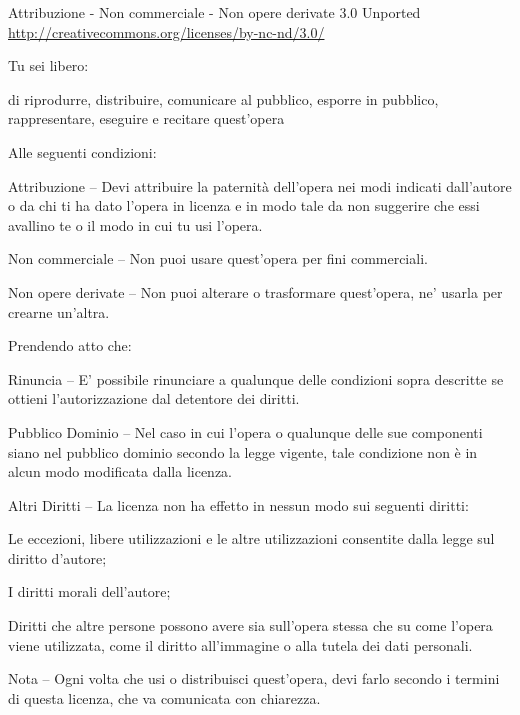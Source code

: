 
\vspace*{-2\baselineskip}

{\smaller\setlength{\parindent}{0pt}%
\raggedright\label{copyright-details}
\setlength{\parskip}{5pt}
{\centering

{\large\ccbyncnd}
\bigskip

Attribuzione - Non commerciale - Non opere derivate 3.0 Unported\\
\href{http://creativecommons.org/licenses/by-nc-nd/3.0/}{http://creativecommons.org/licenses/by-nc-nd/3.0/}

}

Tu sei libero:

\begin{packeditemize}
\item di riprodurre, distribuire, comunicare al pubblico, esporre in pubblico, rappresentare, eseguire e recitare quest'opera
\end{packeditemize}

Alle seguenti condizioni:

\begin{packeditemize}
\item Attribuzione -- Devi attribuire la paternità dell'opera nei modi indicati dall'autore o da chi ti ha dato l'opera in licenza e in modo tale da non suggerire che essi avallino te o il modo in cui tu usi l'opera.
\item Non commerciale -- Non puoi usare quest'opera per fini commerciali.
\item Non opere derivate -- Non puoi alterare o trasformare quest'opera, ne' usarla per crearne un'altra.
\end{packeditemize}

Prendendo atto che:

\begin{packeditemize}
\item Rinuncia -- E' possibile rinunciare a qualunque delle condizioni sopra descritte se ottieni l'autorizzazione dal detentore dei diritti.
\item Pubblico Dominio -- Nel caso in cui l'opera o qualunque delle sue componenti siano nel pubblico dominio secondo la legge vigente, tale condizione non è in alcun modo modificata dalla licenza.
\item Altri Diritti -- La licenza non ha effetto in nessun modo sui seguenti diritti:
\begin{packeditemize}
\item Le eccezioni, libere utilizzazioni e le altre utilizzazioni consentite dalla legge sul diritto d'autore;
\item I diritti morali dell'autore;
\item Diritti che altre persone possono avere sia sull'opera stessa che su come l'opera viene utilizzata, come il diritto all'immagine o alla tutela dei dati personali.
\end{packeditemize}
\item Nota -- Ogni volta che usi o distribuisci quest'opera, devi farlo secondo i termini di questa licenza, che va comunicata con chiarezza.
\end{packeditemize}

}
